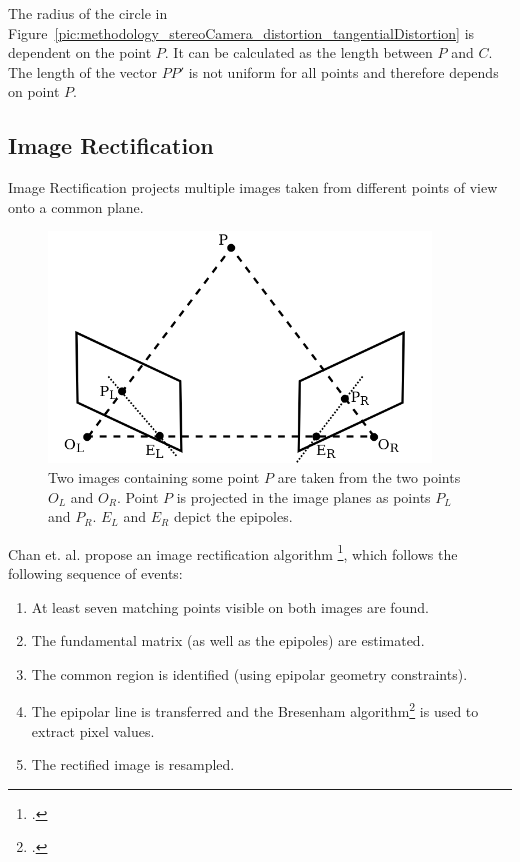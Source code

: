 The radius of the circle in Figure~\ref{pic:methodology_stereoCamera_distortion_tangentialDistortion} is dependent on the point $P$. It can be calculated as the length between $P$ and $C$. The length of the vector $PP'$ is not uniform for all points and therefore depends on point $P$.

\subsection{Image Rectification}
Image Rectification projects multiple images taken from different points of view onto a common plane. 

\begin{figure}[h!]
	\centering
	\includegraphics[width=4in]{img/methodology_stereoCamera_imageRectification.png}
	\caption{Two images containing some point $P$ are taken from the two points $O_L$ and $O_R$. Point $P$ is projected in the image planes as points $P_L$ and $P_R$. $E_L$ and $E_R$ depict the epipoles.}
	\label{pic:methodology_stereoCamera_imageRectification}
\end{figure}

Chan et. al. propose an image rectification algorithm \footcite{Chen_New_Image_Rectification_Algorithm}, which follows the following sequence of events:

\begin{enumerate}
	\item At least seven matching points visible on both images are found.
	\item The fundamental matrix (as well as the epipoles) are estimated.
	\item The common region is identified (using epipolar geometry constraints).
	\item The epipolar line is transferred and the Bresenham algorithm\footcite{Bresenham_Linear_Algorithm_For_Incremental_Digital_Display_Of_Circular_Arcs} is used to extract pixel values.
	\item The rectified image is resampled.
\end{enumerate}

